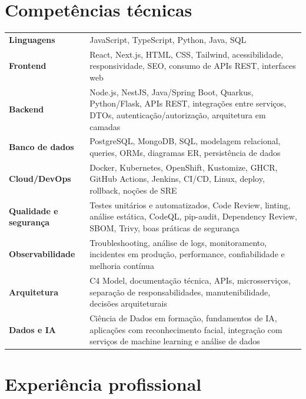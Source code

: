 \documentclass[10pt,a4paper]{article}
\begin{document}
\section*{Competências técnicas}
\begin{tabularx}{\textwidth}{@{}l X@{}}
\textbf{Linguagens} & JavaScript, TypeScript, Python, Java, SQL \\
\textbf{Frontend} & React, Next.js, HTML, CSS, Tailwind, acessibilidade, responsividade, SEO, consumo de APIs REST, interfaces web \\
\textbf{Backend} & Node.js, NestJS, Java/Spring Boot, Quarkus, Python/Flask, APIs REST, integrações entre serviços, DTOs, autenticação/autorização, arquitetura em camadas \\
\textbf{Banco de dados} & PostgreSQL, MongoDB, SQL, modelagem relacional, queries, ORMs, diagramas ER, persistência de dados \\
\textbf{Cloud/DevOps} & Docker, Kubernetes, OpenShift, Kustomize, GHCR, GitHub Actions, Jenkins, CI/CD, Linux, deploy, rollback, noções de SRE \\
\textbf{Qualidade e segurança} & Testes unitários e automatizados, Code Review, linting, análise estática, CodeQL, pip-audit, Dependency Review, SBOM, Trivy, boas práticas de segurança \\
\textbf{Observabilidade} & Troubleshooting, análise de logs, monitoramento, incidentes em produção, performance, confiabilidade e melhoria contínua \\
\textbf{Arquitetura} & C4 Model, documentação técnica, APIs, microsserviços, separação de responsabilidades, manutenibilidade, decisões arquiteturais \\
\textbf{Dados e IA} & Ciência de Dados em formação, fundamentos de IA, aplicações com reconhecimento facial, integração com serviços de machine learning e análise de dados
\end{tabularx}

\section*{Experiência profissional}
\end{document}
